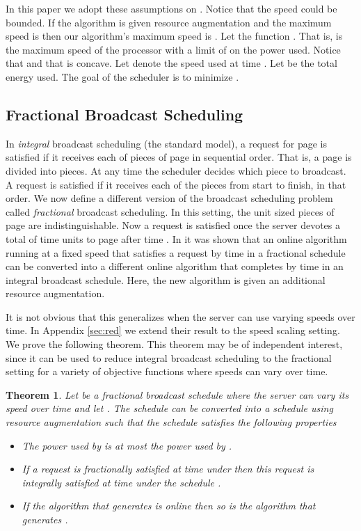 \documentclass[11pt]{article}
\newtheorem{theorem}[lemma]{Theorem}
\begin{document}
In this paper we adopt these assumptions on .  Notice that the speed could be bounded. If the algorithm is given  resource augmentation and the maximum speed is  then our algorithm's maximum speed is .  Let the function .  That is,  is the maximum speed of the processor with a limit of  on the power used.  Notice that  and that  is concave.  Let  denote the speed used at time . Let  be the total energy used.  The goal of the scheduler is to minimize .

\subsection{Fractional Broadcast Scheduling}
In \emph{integral} broadcast scheduling (the standard model), a request  for page   is satisfied if it receives each of  pieces of page  in sequential order.  That is, a page is divided into pieces.  At any time the scheduler decides which piece to broadcast.  A request is satisfied if it receives each of the pieces from start to finish, in that order.   We now define a different version of the broadcast scheduling problem called \emph{fractional} broadcast scheduling.  In this setting, the  unit sized pieces of page  are indistinguishable.  Now a request  is satisfied once the server devotes a total of  time units to page  after time .  In \cite{BansalKN09} it was shown that an online algorithm running at a fixed speed that satisfies a request  by time  in a fractional schedule can be converted into a different online algorithm that completes  by time  in an integral broadcast schedule.  Here, the new algorithm is given an additional  resource augmentation.  

It is not obvious that this generalizes when the server can use varying speeds over time. In Appendix \ref{sec:red} we extend their result to the speed scaling setting. We prove the following theorem.  This theorem may be of independent interest, since it can be used to reduce integral broadcast scheduling to the fractional setting for a variety of objective functions where speeds can vary over time. 

\begin{theorem}
\label{thm:red}
Let  be a fractional broadcast schedule where the server can vary its speed over time and let .  The schedule  can be converted into a schedule  using  resource augmentation such that the schedule  satisfies the following properties
\begin{itemize}
\item The power used by  is at most the power used by .
\item If a request  is fractionally satisfied at time  under  then this request is integrally satisfied at time  under the schedule .
\item If the algorithm that generates  is online then so is the algorithm that generates .
\end{itemize}

\end{theorem}
\end{document}
